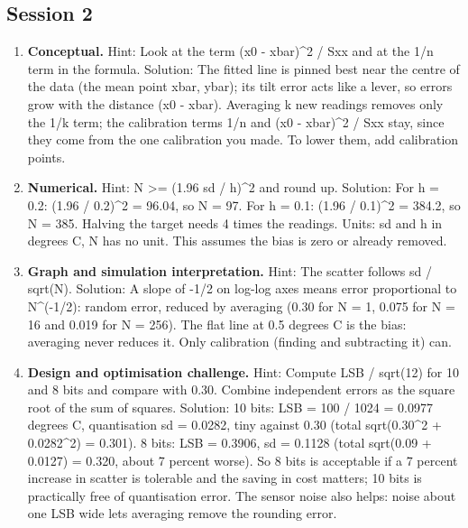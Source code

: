 \documentclass[11pt,a4paper]{article}
\begin{document}
\subsection*{Session 2}
\begin{enumerate}[nosep]
\item \textbf{Conceptual.} Hint: Look at the term (x0 - xbar)\textasciicircum{}2 / Sxx and at the 1/n term in the formula. Solution: The fitted line is pinned best near the centre of the data (the mean point xbar, ybar); its tilt error acts like a lever, so errors grow with the distance (x0 - xbar). Averaging k new readings removes only the 1/k term; the calibration terms 1/n and (x0 - xbar)\textasciicircum{}2 / Sxx stay, since they come from the one calibration you made. To lower them, add calibration points.
\item \textbf{Numerical.} Hint: N \textgreater{}= (1.96 sd / h)\textasciicircum{}2 and round up. Solution: For h = 0.2: (1.96 / 0.2)\textasciicircum{}2 = 96.04, so N = 97. For h = 0.1: (1.96 / 0.1)\textasciicircum{}2 = 384.2, so N = 385. Halving the target needs 4 times the readings. Units: sd and h in degrees C, N has no unit. This assumes the bias is zero or already removed.
\item \textbf{Graph and simulation interpretation.} Hint: The scatter follows sd / sqrt(N). Solution: A slope of -1/2 on log-log axes means error proportional to N\textasciicircum{}(-1/2): random error, reduced by averaging (0.30 for N = 1, 0.075 for N = 16 and 0.019 for N = 256). The flat line at 0.5 degrees C is the bias: averaging never reduces it. Only calibration (finding and subtracting it) can.
\item \textbf{Design and optimisation challenge.} Hint: Compute LSB / sqrt(12) for 10 and 8 bits and compare with 0.30. Combine independent errors as the square root of the sum of squares. Solution: 10 bits: LSB = 100 / 1024 = 0.0977 degrees C, quantisation sd = 0.0282, tiny against 0.30 (total sqrt(0.30\textasciicircum{}2 + 0.0282\textasciicircum{}2) = 0.301). 8 bits: LSB = 0.3906, sd = 0.1128 (total sqrt(0.09 + 0.0127) = 0.320, about 7 percent worse). So 8 bits is acceptable if a 7 percent increase in scatter is tolerable and the saving in cost matters; 10 bits is practically free of quantisation error. The sensor noise also helps: noise about one LSB wide lets averaging remove the rounding error.
\end{enumerate}
\end{document}
